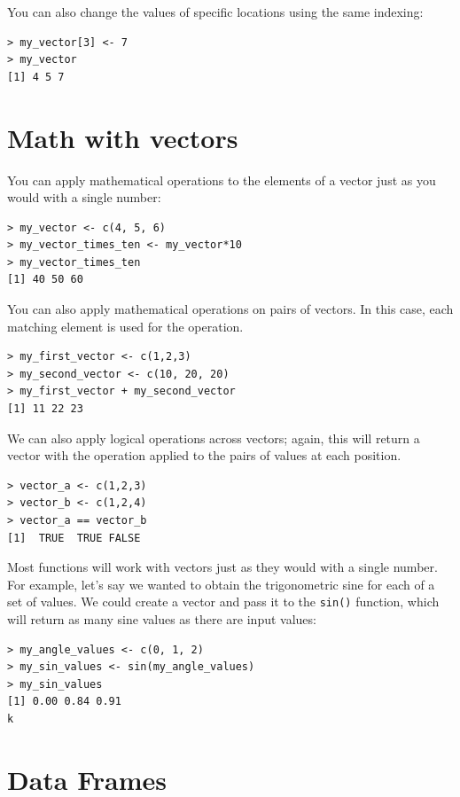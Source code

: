 \documentclass[12pt,]{book}
\begin{document}
You can also change the values of specific locations using the same indexing:

\begin{verbatim}
> my_vector[3] <- 7
> my_vector
[1] 4 5 7
\end{verbatim}

\hypertarget{math-with-vectors}{%
\section{Math with vectors}\label{math-with-vectors}}

You can apply mathematical operations to the elements of a vector just as you would with a single number:

\begin{verbatim}
> my_vector <- c(4, 5, 6)
> my_vector_times_ten <- my_vector*10
> my_vector_times_ten
[1] 40 50 60
\end{verbatim}

You can also apply mathematical operations on pairs of vectors. In this case, each matching element is used for the operation.

\begin{verbatim}
> my_first_vector <- c(1,2,3)
> my_second_vector <- c(10, 20, 20)
> my_first_vector + my_second_vector
[1] 11 22 23
\end{verbatim}

We can also apply logical operations across vectors; again, this will return a vector with the operation applied to the pairs of values at each position.

\begin{verbatim}
> vector_a <- c(1,2,3)
> vector_b <- c(1,2,4)
> vector_a == vector_b
[1]  TRUE  TRUE FALSE

\end{verbatim}

Most functions will work with vectors just as they would with a single number. For example, let's say we wanted to obtain the trigonometric sine for each of a set of values. We could create a vector and pass it to the \texttt{sin()} function, which will return as many sine values as there are input values:

\begin{verbatim}
> my_angle_values <- c(0, 1, 2)
> my_sin_values <- sin(my_angle_values)
> my_sin_values
[1] 0.00 0.84 0.91
k
\end{verbatim}

\hypertarget{data-frames}{%
\section{Data Frames}\label{data-frames}}
\end{document}
